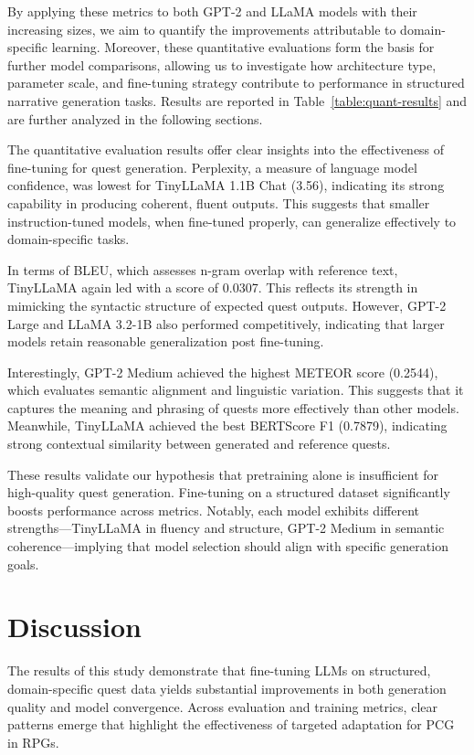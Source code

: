 By applying these metrics to both GPT-2 and LLaMA models with their increasing
sizes, we aim to quantify the improvements attributable to domain-specific learning.
Moreover, these quantitative evaluations form the basis for further model comparisons,
allowing us to investigate how architecture type, parameter scale, and fine-tuning strategy
contribute to performance in structured narrative generation tasks. Results are reported
in Table~\ref{table:quant-results} and are further analyzed in the following sections.

The quantitative evaluation results offer clear insights into the effectiveness of fine-tuning
for quest generation. Perplexity, a measure of language model confidence, was lowest
for TinyLLaMA 1.1B Chat (3.56), indicating its strong capability in producing
coherent, fluent outputs. This suggests that smaller instruction-tuned models, when fine-tuned
properly, can generalize effectively to domain-specific tasks.

In terms of BLEU, which assesses n-gram overlap with reference text, TinyLLaMA
again led with a score of 0.0307. This reflects its strength in mimicking the syntactic
structure of expected quest outputs. However, GPT-2 Large and LLaMA 3.2-1B also
performed competitively, indicating that larger models retain reasonable generalization
post fine-tuning.

Interestingly, GPT-2 Medium achieved the highest METEOR score (0.2544), which
evaluates semantic alignment and linguistic variation. This suggests that it captures the
meaning and phrasing of quests more effectively than other models. Meanwhile, TinyLLaMA
achieved the best BERTScore F1 (0.7879), indicating strong contextual similarity
between generated and reference quests.

These results validate our hypothesis that pretraining alone is insufficient for high-quality
quest generation. Fine-tuning on a structured dataset significantly boosts performance
across metrics. Notably, each model exhibits different strengths—TinyLLaMA
in fluency and structure, GPT-2 Medium in semantic coherence—implying that model
selection should align with specific generation goals.

\section{Discussion}

The results of this study demonstrate that fine-tuning LLMs on structured, domain-specific
quest data yields substantial improvements in both generation quality and model
convergence. Across evaluation and training metrics, clear patterns emerge that highlight
the effectiveness of targeted adaptation for PCG in RPGs.

